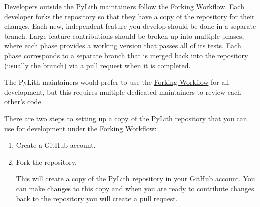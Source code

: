 Developers outside the PyLith maintainers follow the
\href{https://www.atlassian.com/git/tutorials/comparing-workflows/forking-workflow}{Forking
  Workflow}. Each developer forks the 
repository so that they have a copy of the repository for their
changes. Each new, independent feature you develop should be done in a
separate branch. Large feature contributions should be broken up into
multiple phases, where each phase provides a working version that
passes all of its tests. Each phase corresponds to a separate branch
that is merged back into the  repository
(usually the  branch) via a
\href{https://help.github.com/articles/about-pull-requests/}{pull
  request} when it is completed.


The PyLith maintainers would prefer to use the
\href{https://www.atlassian.com/git/tutorials/comparing-workflows/forking-workflow}{Forking
  Workflow} for all development, but this requires multiple dedicated
maintainers to review each other's code.

There are two steps to setting up a copy of the PyLith repository that
you can use for development under the Forking Workflow:
\begin{enumerate}
\item Create a GitHub account.
\item Fork the  repository.

  This will create a copy of the PyLith repository in your GitHub
  account. You can make changes to this copy and when you are ready to
  contribute changes back to the 
  repository you will create a pull request.
\end{enumerate}


